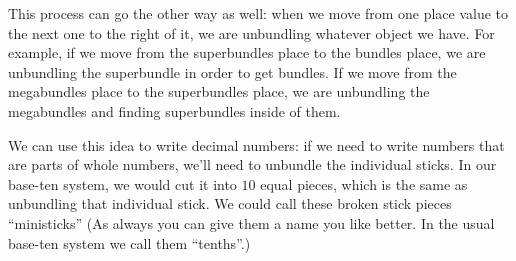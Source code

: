 \documentclass{ximera}
\begin{document}
\begin{image}
\end{image}

This process can go the other way as well: when we move from one place value to the next one to the right of it, we are unbundling whatever object we have. For example, if we move from the superbundles place to the bundles place, we are unbundling the superbundle in order to get bundles. If we move from the megabundles place to the superbundles place, we are unbundling the megabundles and finding superbundles inside of them. 

\begin{image}
\end{image}

We can use this idea to write decimal numbers: if we need to write numbers that are parts of whole numbers, we'll need to unbundle the individual sticks. In our base-ten system, we would cut it into $10$ equal pieces, which is the same as unbundling that individual stick. We could call these broken stick pieces ``ministicks'' (As always you can give them a name you like better. In the usual base-ten system we call them ``tenths''.)

\begin{image}
\end{image}
\end{document}
